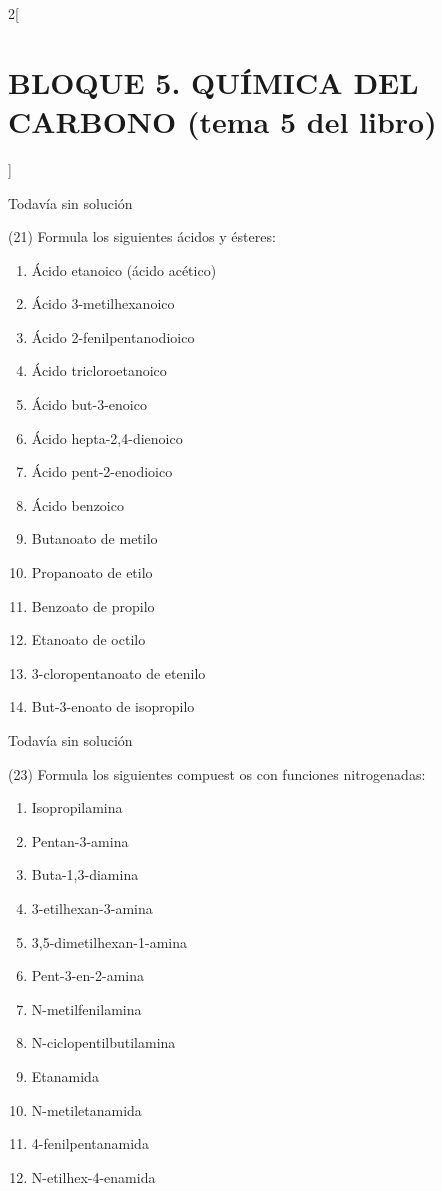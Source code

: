 \documentclass[10pt]{article}
\begin{document}
\begin{multicols}{2}[
  \section{BLOQUE 5. QUÍMICA DEL CARBONO (tema 5 del libro)}
  ]
\begin{solution}[print=false]
  Todavía sin solución
\end{solution}




\begin{exercise}[
    tags    = {},
    topics  = {química, química orgánica, orgánica},
    source  = {FQ 1B MGH 2016, p138, e21},
  ]
  (21) Formula los siguientes ácidos y ésteres:
  \begin{enumerate}
    \item Ácido etanoico (ácido acético)
    \item Ácido 3-metilhexanoico
    \item Ácido 2-fenilpentanodioico
    \item Ácido tricloroetanoico
    \item Ácido but-3-enoico
    \item Ácido hepta-2,4-dienoico
    \item Ácido pent-2-enodioico
    \item Ácido benzoico
    \item Butanoato de metilo
    \item Propanoato de etilo
    \item Benzoato de propilo
    \item Etanoato de octilo
    \item 3-cloropentanoato de etenilo
    \item But-3-enoato de isopropilo
  \end{enumerate}
\end{exercise}

\begin{solution}[print=false]
  Todavía sin solución
\end{solution}




\begin{exercise}[
    tags    = {},
    topics  = {química, química orgánica, orgánica},
    source  = {FQ 1B MGH 2016, p140, e23},
  ]
  (23) Formula los siguientes compuest os con funciones nitrogenadas:
  \begin{enumerate}
    \item Isopropilamina
    \item Pentan-3-amina
    \item Buta-1,3-diamina
    \item 3-etilhexan-3-amina
    \item 3,5-dimetilhexan-1-amina
    \item Pent-3-en-2-amina
    \item N-metilfenilamina
    \item N-ciclopentilbutilamina
    \item Etanamida
    \item N-metiletanamida
    \item 4-fenilpentanamida
    \item N-etilhex-4-enamida
  \end{enumerate}
\end{exercise}


\end{multicols}
\end{document}
